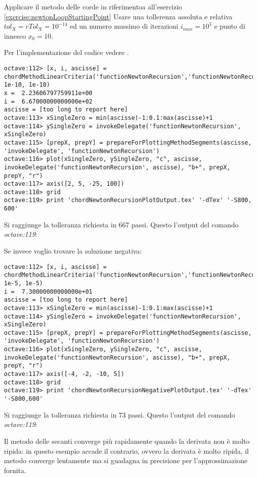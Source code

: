 \begin{exercise}
Applicare il metodo delle corde in riferimentoa all'esercizio
\ref{exercise:newtonLoopStartingPoint} 
Usare una tollerenza assoluta e relativa
$tol_{X} = rTol_{X} = 10^{-14}$ ed un numero massimo di iterazioni
$i_{max} = 10^{5}$ e punto di innesco $x_{0} = 10$.
\end{exercise}
Per l'implementazione del codice vedere .
\begin{lstlisting}
octave:112> [x, i, ascisse] = chordMethodLinearCriteria('functionNewtonRecursion','functionNewtonRecursionDerivative',10,1e5, 1e-10, 1e-10)
x =  2.23606797759911e+00
i =  6.67000000000000e+02
ascisse = [too long to report here]
octave:113> xSingleZero = min(ascisse)-1:0.1:max(ascisse)+1
octave:114> ySingleZero = invokeDelegate('functionNewtonRecursion', xSingleZero)
octave:115> [prepX, prepY] = prepareForPlottingMethodSegments(ascisse, 'invokeDelegate', 'functionNewtonRecursion')
octave:116> plot(xSingleZero, ySingleZero, "c", ascisse, invokeDelegate('functionNewtonRecursion', ascisse), "b+", prepX, prepY, "r")
octave:117> axis([2, 5, -25, 100])
octave:118> grid
octave:119> print 'chordNewtonRecursionPlotOutput.tex' '-dTex' '-S800, 600'
\end{lstlisting}
Si raggiunge la tolleranza richiesta in 667 passi. Questo l'output del comando
\emph{octave:119}:
\begin{center}

\end{center}

Se invece voglio trovare la soluzione negativa:
\begin{lstlisting}
octave:112> [x, i, ascisse] = chordMethodLinearCriteria('functionNewtonRecursion','functionNewtonRecursionDerivative',-5,1e5, 1e-5, 1e-5)
i =  7.30000000000000e+01
ascisse = [too long to report here]
octave:113> xSingleZero = min(ascisse)-1:0.1:max(ascisse)+1
octave:114> ySingleZero = invokeDelegate('functionNewtonRecursion', xSingleZero)
octave:115> [prepX, prepY] = prepareForPlottingMethodSegments(ascisse, 'invokeDelegate', 'functionNewtonRecursion')
octave:116> plot(xSingleZero, ySingleZero, "c", ascisse, invokeDelegate('functionNewtonRecursion', ascisse), "b+", prepX, prepY, "r")
octave:117> axis([-4, -2, -10, 5])
octave:118> grid
octave:119> print 'chordNewtonRecursionNegativePlotOutput.tex' '-dTex' '-S800,600'
\end{lstlisting}
Si raggiunge la tolleranza richiesta in 73 passi. Questo l'output del comando
\emph{octave:119}:
\begin{center}

\end{center}
\begin{oss}
Il metodo delle secanti converge pi\`u rapidamente quando la derivata non \`e
molto ripida: in questo esempio accade il contrario, ovvero la derivata \`e
molto ripida, il metodo converge lentamente ma si guadagna in precisione per
l'approssimazione fornita.
\end{oss}

